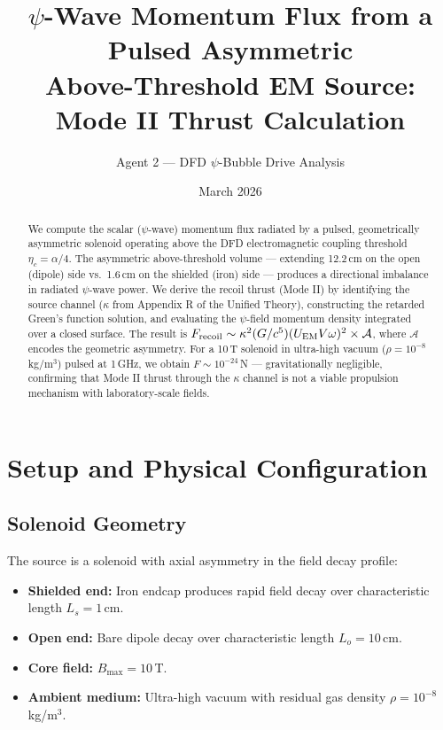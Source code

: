 \documentclass[11pt]{article}
\title{$\psi$-Wave Momentum Flux from a Pulsed Asymmetric\\
Above-Threshold EM Source:\\
Mode II Thrust Calculation}
\author{Agent 2 --- DFD $\psi$-Bubble Drive Analysis}
\date{March 2026}
\begin{document}
\maketitle

\begin{abstract}
We compute the scalar ($\psi$-wave) momentum flux radiated by a pulsed,
geometrically asymmetric solenoid operating above the DFD electromagnetic
coupling threshold $\eta_c = \alpha/4$. The asymmetric above-threshold
volume --- extending 12.2\,cm on the open (dipole) side vs.\ 1.6\,cm on
the shielded (iron) side --- produces a directional imbalance in radiated
$\psi$-wave power. We derive the recoil thrust (Mode II) by identifying
the source channel ($\kappa$ from Appendix R of the Unified Theory),
constructing the retarded Green's function solution, and evaluating the
$\psi$-field momentum density integrated over a closed surface. The
result is $F_{\rm recoil} \sim \kappa^2 (G/c^5)(U_{\rm EM} V \omega)^2
\times \mathcal{A}$, where $\mathcal{A}$ encodes the geometric asymmetry.
For a 10\,T solenoid in ultra-high vacuum ($\rho = 10^{-8}$\,kg/m$^3$)
pulsed at 1\,GHz, we obtain $F \sim 10^{-24}$\,N --- gravitationally
negligible, confirming that Mode II thrust through the $\kappa$ channel
is not a viable propulsion mechanism with laboratory-scale fields.
\end{abstract}

\tableofcontents

\section{Setup and Physical Configuration}\label{sec:setup}

\subsection{Solenoid Geometry}

The source is a solenoid with axial asymmetry in the field decay profile:
\begin{itemize}
\item \textbf{Shielded end:} Iron endcap produces rapid field decay over
  characteristic length $L_s = 1$\,cm.
\item \textbf{Open end:} Bare dipole decay over characteristic length
  $L_o = 10$\,cm.
\item \textbf{Core field:} $B_{\max} = 10$\,T.
\item \textbf{Ambient medium:} Ultra-high vacuum with residual gas density
  $\rho = 10^{-8}$\,kg/m$^3$.
\end{itemize}
\end{document}
